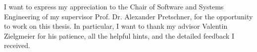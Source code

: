 \documentclass[../main.tex]{subfiles}
\begin{document}
\thispagestyle{empty}

\vspace*{2cm}

\begin{center}
 { \myAcknowTitle}
\end{center}

\vspace{1cm}
\noindent
I want to express my appreciation to the Chair of Software and Systems Engineering of my supervisor Prof. Dr. Alexander Pretschner, for the opportunity to work on this thesis.
In particular, I want to thank my advisor Valentin Zielgmeier for his patience, all the helpful hints, and the detailed feedback I received.
\end{document}
